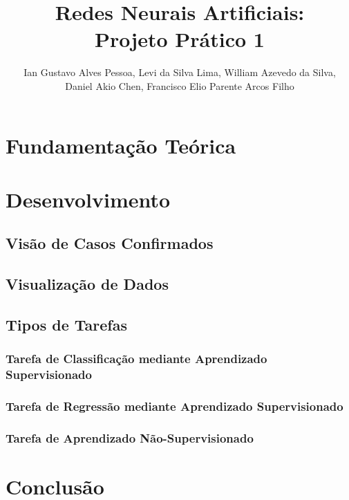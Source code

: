 \documentclass[12pt]{article}
\title{Redes Neurais Artificiais:\\ Projeto Prático 1}
\author{
Ian Gustavo Alves Pessoa\inst{1}, Levi da Silva Lima\inst{2}, William Azevedo da Silva\inst{3}, \\Daniel Akio Chen\inst{4}, Francisco Elio Parente Arcos Filho\inst{5} }
\begin{document}
 

\maketitle




\section{Fundamentação Teórica}



\section{Desenvolvimento}

\subsection{Visão de Casos Confirmados}



\subsection{Visualização de Dados}



\subsection{Tipos de Tarefas}

\subsubsection{Tarefa de Classificação mediante Aprendizado Supervisionado}



\subsubsection{Tarefa de Regressão mediante Aprendizado Supervisionado}



\subsubsection{Tarefa de Aprendizado Não-Supervisionado}








\section{Conclusão}



\nocite{*}


\end{document}
